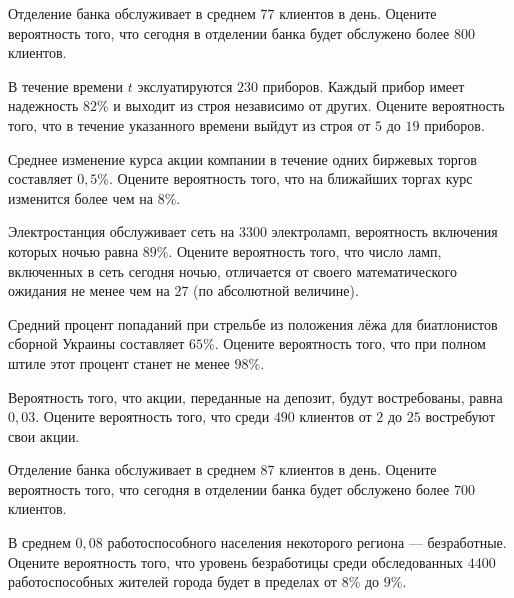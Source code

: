 \vfill

\newpage\setcounter{zad}{0}

\z Отделение банка обслуживает в среднем $ 77 $ клиентов в день. Оцените вероятность того, что сегодня в отделении банка будет обслужено более $ 800 $ клиентов.


\vfill

\z В течение времени $t$ экслуатируются $ 230 $ приборов. Каждый прибор имеет надежность $ 82 \% $ и выходит из строя независимо от других. Оцените вероятность того, что в течение указанного времени выйдут из строя от $ 5 $ до $ 19 $ приборов.
 

\vfill

\newpage\setcounter{zad}{0}

\z Среднее изменение курса акции компании в течение одних биржевых торгов составляет $ 0{,}5 \% $. Оцените вероятность того, что на ближайших торгах курс изменится более чем на $ 8 \% $.


\vfill

\z Электростанция обслуживает сеть на $ 3300 $ электроламп, вероятность включения которых ночью равна $ 89 \% $. Оцените вероятность того, что число ламп, включенных в сеть сегодня ночью, отличается от своего математического ожидания не менее чем на $ 27 $ (по абсолютной величине). 
 

\vfill

\newpage\setcounter{zad}{0}

\z Средний процент попаданий при стрельбе из положения лёжа для биатлонистов сборной Украины составляет $ 65 \% $. Оцените вероятность того, что при полном штиле этот процент станет не менее $ 98 \% $.


\vfill

\z Вероятность того, что акции, переданные на депозит, будут востребованы, равна $ 0{,}03 $. Оцените вероятность того, что среди $ 490 $ клиентов от $ 2 $ до $ 25 $ востребуют свои акции.
 

\vfill

\newpage\setcounter{zad}{0}

\z Отделение банка обслуживает в среднем $ 87 $ клиентов в день. Оцените вероятность того, что сегодня в отделении банка будет обслужено более $ 700 $ клиентов.


\vfill

\z В среднем $ 0{,}08 $ работоспособного населения некоторого региона --- безработные. Оцените вероятность того, что уровень безработицы среди обследованных $ 4400 $ работоспособных жителей города будет в пределах от $ 8 \%$ до $ 9 \%$.
 


